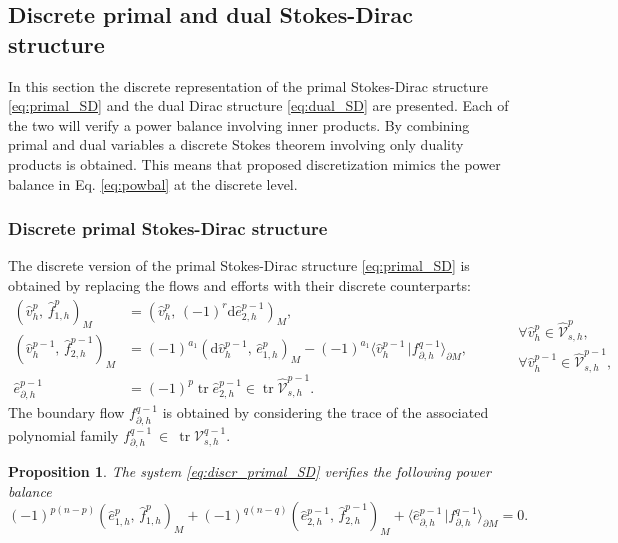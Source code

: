 \documentclass{elsarticle}
\newcommand{\revTwo}[1]{{\color{black}#1}}
\newtheorem{proposition}{Proposition}
\renewcommand\d{\ensuremath{\mathrm{d}}}
\DeclareMathOperator{\tr}{tr}
\newcommand*{\dual}[1]{\ensuremath{\widehat{#1}}}
\newcommand{\inpr}[3][]{\ensuremath{( #2, \, #3 )_{#1}}}
\newcommand{\dualpr}[3][]{\ensuremath{\langle #2 \, \vert #3 \rangle_{#1}}}
\begin{document}
\revTwo{\subsection{Discrete primal and dual Stokes-Dirac structure}}
\revTwo{In this section the discrete representation of the primal Stokes-Dirac structure \eqref{eq:primal_SD} and the dual Dirac structure \eqref{eq:dual_SD} are presented. Each of the two will verify a power balance involving inner products. By combining primal and dual variables a discrete Stokes theorem involving only duality products is obtained. This means that proposed discretization mimics the power balance in Eq. \eqref{eq:powbal}  at the discrete level.

\subsubsection{Discrete primal Stokes-Dirac structure}
The discrete version of the primal  Stokes-Dirac structure \eqref{eq:primal_SD} is obtained by replacing the flows and efforts with their discrete counterparts:\\
\begin{equation}\label{eq:discr_primal_SD}
    \begin{aligned}
    \inpr[M]{\dual{v}^p_h}{\dual{f}^p_{1, h}} &= \inpr[M]{\dual{v}^p_h}{(-1)^r\d \dual{e}^{p-1}_{2, h}}, \\
      \inpr[M]{\dual{v}^{p-1}_h}{\dual{f}^{p-1}_{2, h}} &= (-1)^{a_1} \inpr[M]{\d\dual{v}^{p-1}_h}{ \dual{e}^p_{1, h}} - (-1)^{a_1} \dualpr[\partial M]{\dual{v}^{p-1}_h}{f_{\partial, h}^{q-1}}, \\
      \dual{e}_{\partial, h}^{p-1} &= (-1)^p \tr \dual{e}_{2, h}^{p-1} \in \tr \dual{\mathcal{V}}_{s, h}^{p-1}.
    \end{aligned} \qquad
    \begin{aligned}
    &\forall \dual{v}^p_h \in \dual{\mathcal{V}}_{s, h}^p, \\
    &\forall \dual{v}^{p-1}_h \in \dual{\mathcal{V}}_{s, h}^{p-1},\\
    &
    \end{aligned}
\end{equation}
The boundary flow $f_{\partial, h}^{q-1}$ is obtained by considering the trace of the associated polynomial family $f_{\partial, h}^{q-1}~\in~\tr \mathcal{V}_{s, h}^{q-1}$. 
\begin{proposition}\label{pr:discr_innerpowbal_primal}
The system \eqref{eq:discr_primal_SD} verifies the following power balance 
\begin{equation}\label{eq:discr_powbal_primal} 
(-1)^{p(n-p)}\inpr[M]{\dual{e}^p_{1, h}}{\dual{f}^p_{1, h}} + (-1)^{q(n-q)} \inpr[M]{\dual{e}^{p-1}_{2, h}}{\dual{f}^{p-1}_{2, h}} + \dualpr[\partial M]{\dual{e}^{p-1}_{\partial, h}}{f_{\partial, h}^{q-1}} = 0.
\end{equation}
\end{proposition}

}
\end{document}
